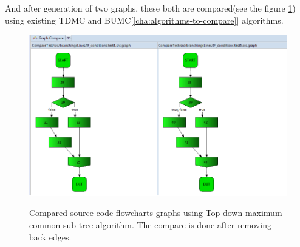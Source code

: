 \documentclass{report}
\begin{document}
And after generation of two graphs, these both are compared(see the figure \ref{fig:graphs-compared}) using existing TDMC and BUMC[\ref{cha:algorithms-to-compare}] algorithms.
\begin{figure}
  \centering
  \includegraphics[scale = 0.6]{Figures/Java-flowchart-exp/graphs-compared.png}\\[0.1cm]
  \caption[Compared flowchart graphs using TDMC algorithm \ref{sec:topdown} ]{Compared source code flowcharts graphs using Top down maximum common sub-tree algorithm. The compare is done after removing back edges.}
  \label{fig:graphs-compared}
\end{figure}
\end{document}
